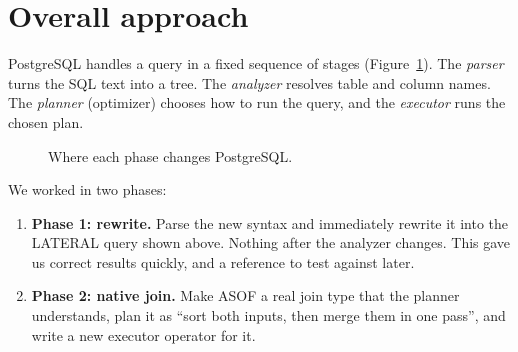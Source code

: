 \documentclass[11pt,a4paper]{article}
\begin{document}
\section{Overall approach}

PostgreSQL handles a query in a fixed sequence of stages (Figure~\ref{fig:pipeline}). The
\emph{parser} turns the SQL text into a tree. The \emph{analyzer} resolves table and
column names. The \emph{planner} (optimizer) chooses how to run the query, and the
\emph{executor} runs the chosen plan.

\begin{figure}[h]
\centering
{}
\caption{Where each phase changes PostgreSQL.}
\label{fig:pipeline}
\end{figure}

We worked in two phases:

\begin{enumerate}
  \item \textbf{Phase 1: rewrite.} Parse the new syntax and immediately rewrite it into
        the LATERAL query shown above. Nothing after the analyzer changes. This gave us
        correct results quickly, and a reference to test against later.
  \item \textbf{Phase 2: native join.} Make ASOF a real join type that the planner
        understands, plan it as ``sort both inputs, then merge them in one pass'', and
        write a new executor operator for it.
\end{enumerate}
\end{document}
